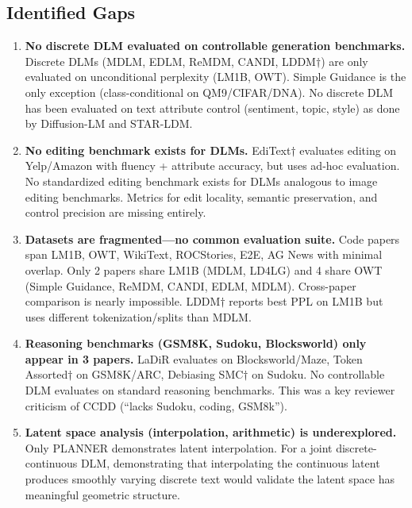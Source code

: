 \documentclass{article}
\begin{document}
\subsection{Identified Gaps}

\begin{enumerate}[label=\textbf{TD\arabic*.}, leftmargin=2em]
    \item \textbf{No discrete DLM evaluated on controllable generation benchmarks.}
    Discrete DLMs (MDLM, EDLM, ReMDM, CANDI, LDDM$\dagger$) are only evaluated on unconditional perplexity (LM1B, OWT). Simple Guidance is the only exception (class-conditional on QM9/CIFAR/DNA). No discrete DLM has been evaluated on text attribute control (sentiment, topic, style) as done by Diffusion-LM and STAR-LDM.

    \item \textbf{No editing benchmark exists for DLMs.}
    EdiText$\dagger$ evaluates editing on Yelp/Amazon with fluency + attribute accuracy, but uses ad-hoc evaluation. No standardized editing benchmark exists for DLMs analogous to image editing benchmarks. Metrics for edit locality, semantic preservation, and control precision are missing entirely.

    \item \textbf{Datasets are fragmented---no common evaluation suite.}
    Code papers span LM1B, OWT, WikiText, ROCStories, E2E, AG News with minimal overlap. Only 2 papers share LM1B (MDLM, LD4LG) and 4 share OWT (Simple Guidance, ReMDM, CANDI, EDLM, MDLM). Cross-paper comparison is nearly impossible. LDDM$\dagger$ reports best PPL on LM1B but uses different tokenization/splits than MDLM.

    \item \textbf{Reasoning benchmarks (GSM8K, Sudoku, Blocksworld) only appear in 3 papers.}
    LaDiR evaluates on Blocksworld/Maze, Token Assorted$\dagger$ on GSM8K/ARC, Debiasing SMC$\dagger$ on Sudoku. No controllable DLM evaluates on standard reasoning benchmarks. This was a key reviewer criticism of CCDD (``lacks Sudoku, coding, GSM8k'').

    \item \textbf{Latent space analysis (interpolation, arithmetic) is underexplored.}
    Only PLANNER demonstrates latent interpolation. For a joint discrete-continuous DLM, demonstrating that interpolating the continuous latent produces smoothly varying discrete text would validate the latent space has meaningful geometric structure.
\end{enumerate}
\end{document}
